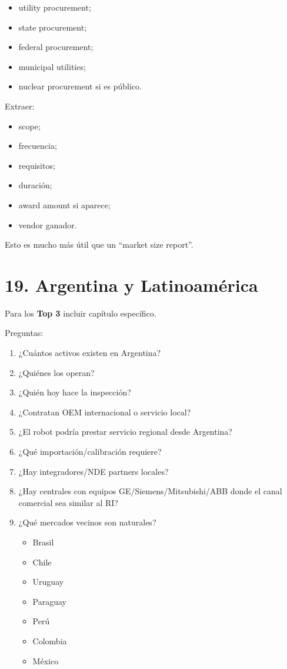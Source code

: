 \documentclass[11pt,a4paper]{article}
\begin{document}
\begin{itemize}
\item utility procurement;
\item state procurement;
\item federal procurement;
\item municipal utilities;
\item nuclear procurement si es público.
\end{itemize}

Extraer:

\begin{itemize}
\item scope;
\item frecuencia;
\item requisitos;
\item duración;
\item award amount si aparece;
\item vendor ganador.
\end{itemize}

Esto es mucho más útil que un ``market size report''.


\section*{19. Argentina y Latinoamérica}
Para los \textbf{Top 3} incluir capítulo específico.

Preguntas:

\begin{enumerate}
\item ¿Cuántos activos existen en Argentina?
\item ¿Quiénes los operan?
\item ¿Quién hoy hace la inspección?
\item ¿Contratan OEM internacional o servicio local?
\item ¿El robot podría prestar servicio regional desde Argentina?
\item ¿Qué importación/calibración requiere?
\item ¿Hay integradores/NDE partners locales?
\item ¿Hay centrales con equipos GE/Siemens/Mitsubishi/ABB donde el canal comercial sea similar al RI?
\item ¿Qué mercados vecinos son naturales?
\begin{itemize}
\item Brasil
\item Chile
\item Uruguay
\item Paraguay
\item Perú
\item Colombia
\item México
\end{itemize}
\end{enumerate}
\end{document}
